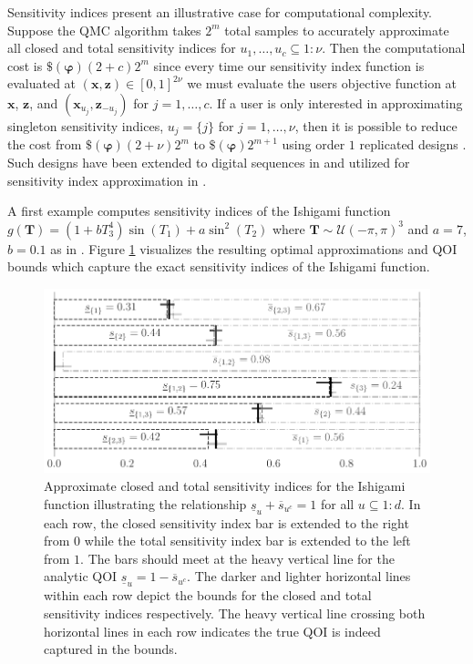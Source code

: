 \documentclass[graybox]{svmult}
\begin{document}
Sensitivity indices present an illustrative case for computational complexity. Suppose the QMC algorithm takes $2^m$ total samples to accurately approximate all closed and total sensitivity indices for $u_1,\dots,u_c \subseteq 1:\nu$. Then the computational cost is $\$(\boldsymbol{\varphi})(2+c)2^m$ since every time our sensitivity index function is evaluated at $(\boldsymbol{x},\boldsymbol{z}) \in [0,1]^{2\nu}$ we must evaluate the users objective function at $\boldsymbol{x}$, $\boldsymbol{z}$, and $(\boldsymbol{x}_{u_j},\boldsymbol{z}_{-{u_j}})$ for $j=1,\dots,c$. If a user is only interested in approximating singleton sensitivity indices, $u_j = \{j\}$ for $j=1,\dots,\nu$, then it is possible to reduce the cost from $\$(\boldsymbol{\varphi})(2+\nu)2^m$ to $\$(\boldsymbol{\varphi})2^{m+1}$ using order $1$ replicated designs \cite{alex2008comparison,tissot2015randomized}. Such designs have been extended to  digital sequences in \cite{replicated_designs_sobol_seq} and utilized for sensitivity index approximation in \cite{reliable_sobol_indices_approx}.

A first example computes sensitivity indices of the Ishigami function \cite{ishigami1990importance} $g(\boldsymbol{T}) = (1+bT_3^4)\sin(T_1)+a\sin^2(T_2)$ where $\boldsymbol{T} \sim \mathcal{U}(-\pi,\pi)^3$ and $a=7$, $b=0.1$ as in \cite{crestaux2007polynomial,marrel2009calculations}. Figure \ref{SoRa_fig:ishigami} visualizes the resulting optimal approximations and QOI bounds which capture the exact sensitivity indices of the Ishigami function. 

\begin{figure}[t]
    \centering
    \includegraphics[width=.8\textwidth]{figs/ishigami.pdf}
    \caption{Approximate closed and total sensitivity indices for the Ishigami function illustrating the relationship $\underline{s}_u + \overline{s}_{u^c} = 1$ for all $u \subseteq 1:d$. In each row, the closed sensitivity index bar is  extended to the right from $0$ while the total sensitivity index bar is extended to the left from $1$. The bars should meet at the heavy vertical line for the analytic QOI $\underline{s}_u=1-\overline{s}_{u^c}$. The darker and lighter horizontal lines within each row depict the bounds for the closed and total sensitivity indices respectively. The heavy vertical line crossing both horizontal lines in each row indicates the true QOI is indeed captured in the bounds.}
    \label{SoRa_fig:ishigami}
\end{figure}
\end{document}
